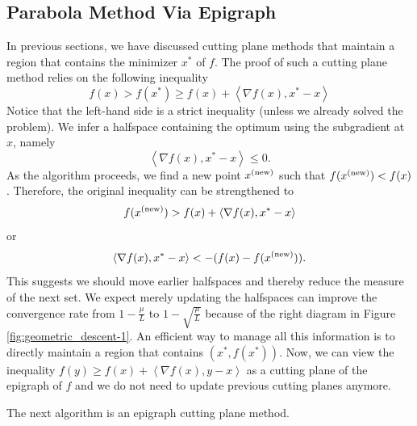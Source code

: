 \subsection{Parabola Method Via Epigraph}

In previous sections, we have discussed cutting plane methods that
maintain a region that contains the minimizer $x^{*}$ of $f$. The
proof of such a cutting plane method relies on the following inequality
\begin{equation}
f(x)>f(x^{*})\geq f(x)+\left\langle \nabla f(x),x^{*}-x\right\rangle \label{eq:epigraph_cuttingplane-1}
\end{equation}
Notice that the left-hand side is a strict inequality (unless we already
solved the problem). We infer a halfspace containing the optimum using
the subgradient at $x$, namely 
\[
\left\langle \nabla f(x),x^{*}-x\right\rangle \le0.
\]
As the algorithm proceeds, we find a new point $x^{(\mathrm{new})}$ such that
$f(x^{(\mathrm{new})})<f(x)$. Therefore, the original inequality can be strengthened
to 
\[
f(x^{(\mathrm{new})})>f(x)+\left\langle \nabla f(x),x^{*}-x\right\rangle 
\]
or 
\[
\left\langle \nabla f(x),x^{*}-x\right\rangle <-(f(x)-f(x^{(\mathrm{new})})).
\]
This suggests we should move earlier halfspaces and thereby reduce
the measure of the next set. We expect merely updating the halfspaces
can improve the convergence rate from $1-\frac{\mu}{L}$ to $1-\sqrt{\frac{\mu}{L}}$
because of the right diagram in Figure \ref{fig:geometric_descent-1}.
An efficient way to manage all this information is to directly maintain
a region that contains $(x^{*},f(x^{*}))$. Now, we can view the inequality
$f(y)\geq f(x)+\left\langle \nabla f(x),y-x\right\rangle $ as a cutting
plane of the epigraph of $f$ and we do not need to update previous
cutting planes anymore.

The next algorithm is an epigraph cutting plane method.

